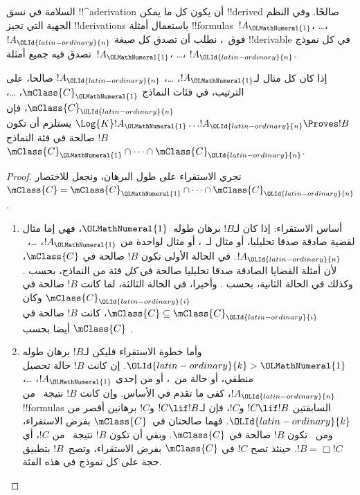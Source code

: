 \documentclass[../../../include/open-logic-section]{subfiles}
\begin{document}


السلامة في نسق !!^a{derivation} أن يكون كل ما يمكن !!{derive}d
صالحًا. وفي النظم الجهية التي تجيز !!{derivation}s باستعمال
أمثلة !!{formula}s~$!A_{\OLMathNumeral{1}}$، \dots،~$!A_{\OLId{latin-ordinary}{n}}$ فوق~،
نطلب أن تصدق كل صيغة !!{derivable} في كل نموذج تصدق فيه
جميع أمثلة~$!A_{\OLMathNumeral{1}}$، \dots، $!A_{\OLId{latin-ordinary}{n}}$.

\begin{thm}
  إذا كان كل مثال لـ$!A_{\OLMathNumeral{1}}$، \dots، $!A_{\OLId{latin-ordinary}{n}}$ صالحا، على الترتيب، في
  فئات النماذج $\mClass{C}_{\OLMathNumeral{1}}$، \dots، $\mClass{C}_{\OLId{latin-ordinary}{n}}$، فإن
  $\Log{K}!A_{\OLMathNumeral{1}}\dots !A_{\OLId{latin-ordinary}{n}} \Proves !B$ يستلزم أن تكون $!B$ صالحة في
  فئة النماذج $\mClass{C}_{\OLMathNumeral{1}} \cap \dots \cap \mClass{C}_{\OLId{latin-ordinary}{n}}$.
\end{thm}

\begin{proof}
  نجري الاستقراء على طول البرهان، ونجعل للاختصار
  $\mClass{C} =
  \mClass{C}_{\OLMathNumeral{1}} \cap \dots \cap \mClass{C}_{\OLId{latin-ordinary}{n}}$.
  \begin{enumerate}
  \item أساس الاستقراء: إذا كان لـ$!B$ برهان طوله~${\OLMathNumeral{1}}$، فهي إما مثال
    لقضية صادقة صدقا تحليليا، أو مثال لـ~،
     أو مثال لواحدة من $!A_{\OLMathNumeral{1}}$،
    \dots،~$!A_{\OLId{latin-ordinary}{n}}$. في الحالة الأولى تكون $!B$ صالحة في
    $\mClass{C}$، لأن أمثلة القضايا الصادقة صدقا تحليليا صالحة في
    \emph{كل} فئة من النماذج، بحسب .
    وكذلك في الحالة الثانية، بحسب
    . وأخيرا، في الحالة الثالثة،
    لما كانت $!B$ صالحة في $\mClass{C}_{\OLId{latin-ordinary}{i}}$ وكان $\mClass{C} \subseteq
    \mClass{C}_{\OLId{latin-ordinary}{i}}$، كانت $!B$ صالحة في $\mClass{C}$ أيضا بحسب
    .
  \item وأما خطوة الاستقراء فليكن لـ$!B$ برهان طوله ${\OLId{latin-ordinary}{k}}>{\OLMathNumeral{1}}$.
    إن كانت $!B$ حالة تحصيل منطقي، أو حالة من~،
     أو من إحدى
    $!A_{\OLMathNumeral{1}}$، \dots، $!A_{\OLId{latin-ordinary}{n}}$، كفى ما تقدم في الأساس.
    وإن كانت $!B$ نتيجة~\MP{} من !!{formula}s السابقتين
    $!C \lif !B$ و$!C$، فإن لـ$!C \lif !B$ و$!C$ برهانين
    أقصر من ${\OLId{latin-ordinary}{k}}$. فهما صالحتان في~$\mClass{C}$ بفرض الاستقراء،
    ومن~ تكون $!B$ صالحة في
    $\mClass{C}$. وبقي أن تكون $!B$ نتيجة~\Nec{} من $!C$،
    أي $!B = \Box!C$. حينئذ تصح $!C$ في $\mClass{C}$
    بفرض الاستقراء، وتصح~$!B$ بتطبيق حجة
     على كل نموذج في هذه الفئة.
  \end{enumerate}
\end{proof}
\end{document}
